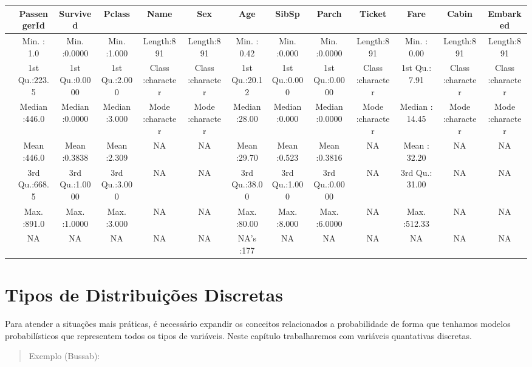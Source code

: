 \documentclass[
]{book}
\begin{document}
\begin{tabular}{l|c|c|c|c|c|c|c|c|c|c|c|c}
\hline
  &  PassengerId &    Survived &     Pclass &     Name &     Sex &      Age &     SibSp &     Parch &    Ticket &      Fare &    Cabin &   Embarked\\
\hline
 & Min.   :  1.0 & Min.   :0.0000 & Min.   :1.000 & Length:891 & Length:891 & Min.   : 0.42 & Min.   :0.000 & Min.   :0.0000 & Length:891 & Min.   :  0.00 & Length:891 & Length:891\\
\hline
 & 1st Qu.:223.5 & 1st Qu.:0.0000 & 1st Qu.:2.000 & Class :character & Class :character & 1st Qu.:20.12 & 1st Qu.:0.000 & 1st Qu.:0.0000 & Class :character & 1st Qu.:  7.91 & Class :character & Class :character\\
\hline
 & Median :446.0 & Median :0.0000 & Median :3.000 & Mode  :character & Mode  :character & Median :28.00 & Median :0.000 & Median :0.0000 & Mode  :character & Median : 14.45 & Mode  :character & Mode  :character\\
\hline
 & Mean   :446.0 & Mean   :0.3838 & Mean   :2.309 & NA & NA & Mean   :29.70 & Mean   :0.523 & Mean   :0.3816 & NA & Mean   : 32.20 & NA & NA\\
\hline
 & 3rd Qu.:668.5 & 3rd Qu.:1.0000 & 3rd Qu.:3.000 & NA & NA & 3rd Qu.:38.00 & 3rd Qu.:1.000 & 3rd Qu.:0.0000 & NA & 3rd Qu.: 31.00 & NA & NA\\
\hline
 & Max.   :891.0 & Max.   :1.0000 & Max.   :3.000 & NA & NA & Max.   :80.00 & Max.   :8.000 & Max.   :6.0000 & NA & Max.   :512.33 & NA & NA\\
\hline
 & NA & NA & NA & NA & NA & NA's   :177 & NA & NA & NA & NA & NA & NA\\
\hline
\end{tabular}

\hypertarget{tipos-de-distribuiuxe7uxf5es-discretas}{%
\chapter{Tipos de Distribuições Discretas}\label{tipos-de-distribuiuxe7uxf5es-discretas}}

Para atender a situações mais práticas, é necessário expandir os conceitos relacionados a probabilidade de forma que tenhamos modelos probabilísticos que representem todos os tipos de variáveis. Neste capítulo trabalharemos com variáveis quantativas discretas.

\begin{quote}
Exemplo (Bussab):
\end{quote}
\end{document}

